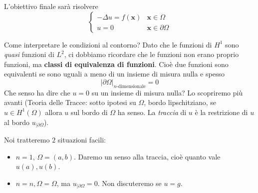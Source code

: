 \documentclass[10pt,a4paper,twoside,openright]{book}
\newcommand{\x}{\mathbf{x}}
\begin{document}
L'obiettivo finale sarà risolvere
\begin{equation*}
	\begin{cases}
		-\Delta u=f(\x) & \x \in \Omega          \\
		u=0                     & \x \in \partial \Omega 
	\end{cases}
\end{equation*}
\begin{oss}
	Come interpretare le condizioni al contorno? Dato che le funzioni di $H^{1}$ sono \textit{quasi} funzioni di $L^{2}$, ci dobbiamo ricordare che le funzioni non erano proprio funzioni, ma \textbf{classi di equivalenza di funzioni}. Cioè due funzioni sono equivalenti se sono uguali a meno di un insieme di misura nulla e spesso
	\begin{equation*}
		| \partial \Omega | _{n\text{-dimensionale}} =0
	\end{equation*}
	Che senso ha dire che $u=0$ su un insieme di misura nulla? Lo scopriremo più avanti (Teoria delle Tracce: sotto ipotesi su $\Omega $, bordo lipschitziano, se $u\in H^{1}( \Omega )$ allora $u$ sul bordo di $\Omega $ ha senso. La \textit{traccia} di $u$ è la restrizione di $u$ al bordo $u_{|\partial \Omega }$).
\end{oss}
Noi tratteremo $2$ situazioni facili:
\begin{itemize}
	\item $n=1$, $\Omega =( a,b)$. Daremo un senso alla traccia, cioè quanto vale $u( a) ,u( b)$.
	\item $n=n,\Omega =\Omega $, ma $u_{|\partial \Omega } =0$. Non discuteremo se $u=g$.
\end{itemize}
\end{document}
